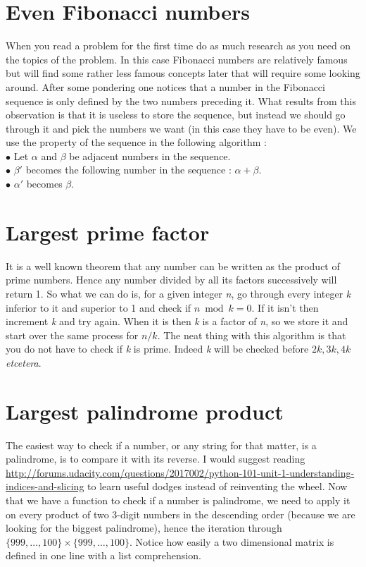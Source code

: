 \documentclass[11pt]{article}
\begin{document}
\section{Even Fibonacci numbers}
When you read a problem for the first time do as much research as you need on the topics of the problem. In this case Fibonacci numbers are relatively famous but will find some rather less famous concepts later that will require some looking around. After some pondering one notices that a number in the Fibonacci sequence is only defined by the two numbers preceding it. What results from this observation is that it is useless to store the sequence, but instead we should go through it and pick the numbers we want (in this case they have to be even). We use the property of the sequence in the following algorithm :
\bigskip
\\ $\bullet$ Let $\alpha$ and $\beta$ be adjacent numbers in the sequence.
\\ $\bullet$ $\beta'$ becomes the following number in the sequence : $\alpha + \beta$.
\\ $\bullet$ $\alpha'$ becomes $\beta$.

\section{Largest prime factor}
It is a well known theorem that any number can be written as the product of prime numbers. Hence any number divided by all its factors successively will return 1. So what we can do is, for a given integer \emph{n}, go through every integer \emph{k} inferior to it and superior to 1 and check if $n\bmod k = 0$. If it isn't then increment \emph{k} and try again. When it is then \emph{k} is a factor of \emph{n}, so we store it and start over the same process for $n/k$. The neat thing with this algorithm is that you do not have to check if \emph{k} is prime. Indeed \emph{k} will be checked before $2k,3k,4k$ \emph{etcetera}.

\section{Largest palindrome product}
The easiest way to check if a number, or any string for that matter, is a palindrome, is to compare it with its reverse. I would suggest reading \url{http://forums.udacity.com/questions/2017002/python-101-unit-1-understanding-indices-and-slicing} to learn useful dodges instead of reinventing the wheel. Now that we have a function to check if a number is palindrome, we need to apply it on every product of two 3-digit numbers in the descending order (because we are looking for the biggest palindrome), hence the iteration through $\{999,\dots,100\} \times \{999,\dots,100\}$. Notice how easily a two dimensional matrix is defined in one line with a list comprehension.
\end{document}

